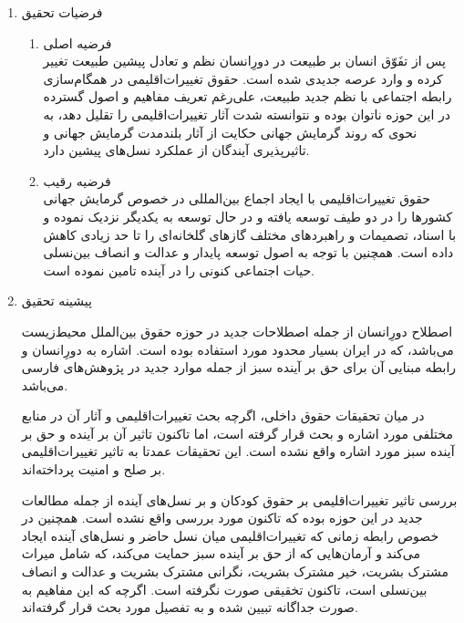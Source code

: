 \begin{enumerate}
\begin{enumerate}
	
		
	\end{enumerate}
	
	\item فرضیات تحقیق
	
	\begin{enumerate}
		
		\item فرضیه اصلی\\
		پس از تفَوّق انسان بر طبیعت در دورِانسان نظم و تعادل پیشین طبیعت تغییر کرده و وارد عرصه جدیدی شده است.   حقوق تغییرات‌اقلیمی در همگام‌سازی رابطه اجتماعی با نظم جدید طبیعت، علی‌رغم تعریف مفاهیم و اصول گسترده در این حوزه ناتوان بوده و نتوانسته شدت آثار تغییرات‌اقلیمی  را تقلیل دهد، به نحوی که روند گرمایش جهانی حکایت از آثار بلند‌مدت گرمایش جهانی و تاثیرپذیری آیندگان از عملکرد نسل‌های پیشین دارد.
		
		\item فرضیه رقیب \\
		حقوق تغییرات‌اقلیمی با ایجاد اجماع بین‌المللی در خصوص گرمایش جهانی کشور‌ها را در دو طیف توسعه یافته و در حال توسعه به یکدیگر نزدیک نموده و با اسناد، تصمیمات و راهبرد‌های مختلف گاز‌های گلخانه‌ای را تا حد زیادی کاهش داده است. همچنین با توجه به اصول توسعه پایدار و عدالت و انصاف بین‌نسلی حیات اجتماعی کنونی را در آینده تامین نموده است.
		
		
	\end{enumerate}


	
	
	\item پیشینه تحقیق

		اصطلاح دورِانسان از جمله اصطلاحات جدید در حوزه حقوق بین‌الملل محیط‌زیست می‌باشد، که در ایران بسیار محدود مورد استفاده بوده است. 	اشاره به دورِانسان و رابطه مبنایی آن برای حق بر آینده سبز از جمله موارد جدید در پژوهش‌های فارسی می‌باشد. 
		
		در میان تحقیقات حقوق داخلی، اگر‌چه بحث تغییرات‌اقلیمی و آثار آن در منابع مختلفی مورد اشاره و بحث قرار گرفته است، اما تاکنون تاثیر آن بر آینده و حق بر آینده سبز مورد اشاره واقع نشده است. 
		این تحقیقات عمدتا به تاثیر تغییرات‌اقلیمی بر صلح و امنیت پرداخته‌اند. 

بررسی تاثیر تغییرات‌اقلیمی بر حقوق کودکان و بر نسل‌های آینده از جمله مطالعات جدید در این حوزه بوده که تاکنون مورد بررسی واقع نشده است. همچنین در خصوص رابطه زمانی که تغییرات‌اقلیمی میان نسل حاضر و نسل‌های آینده ایجاد می‌کند و آرمان‌هایی که از حق بر آینده سبز حمایت می‌کند، که شامل میراث مشترک بشریت، خیر مشترک بشریت، نگرانی مشترک بشریت و عدالت و انصاف بین‌نسلی است، تاکنون تخقیقی صورت نگرفته است. اگرچه که این مفاهیم به صورت جداگانه  تبیین شده و به تفصیل مورد بحث قرار گرفته‌اند. 
		

\end{enumerate}
